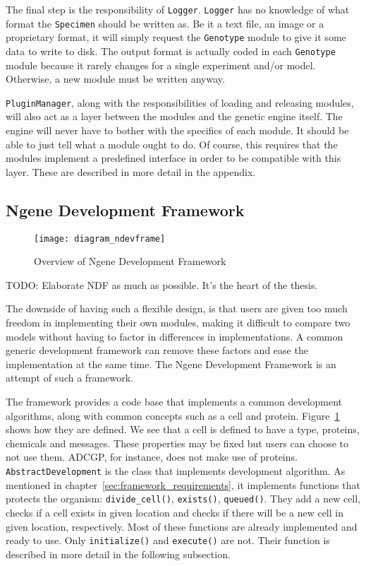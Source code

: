 The final step is the responsibility of \texttt{Logger}. \texttt{Logger} has no knowledge of what format the \texttt{Specimen} should be written as. Be it a text file, an image or a proprietary format, it will simply request the \texttt{Genotype} module to give it some data to write to disk. The output format is actually coded in each \texttt{Genotype} module because it rarely changes for a single experiment and/or model. Otherwise, a new module must be written anyway.

\texttt{PluginManager}, along with the responsibilities of loading and releasing modules, will also act as a layer between the modules and the genetic engine itself. The engine will never have to bother with the specifics of each module. It should be able to just tell what a module ought to do. Of course, this requires that the modules implement a predefined interface in order to be compatible with this layer. These are described in more detail in the appendix.

\subsection{Ngene Development Framework}
\begin{figure}[!ht]
	\centering
	\texttt{[image: diagram\_ndevframe]}
	\caption{Overview of Ngene Development Framework}
	\label{fig:diagram_ndevframe}
\end{figure}

TODO:
Elaborate NDF as much as possible. It's the heart of the thesis.

The downside of having such a flexible design, is that users are given too much freedom in implementing their own modules, making it difficult to compare two models without having to factor in differences in implementations. A common generic development framework can remove these factors and ease the implementation at the same time. The Ngene Development Framework is an attempt of such a framework.

The framework provides a code base that implements a common development algorithms, along with common concepts such as a cell and protein. Figure~\ref{fig:diagram_ndevframe} shows how they are defined. We see that a cell is defined to have a type, proteins, chemicals and messages. These properties may be fixed but users can choose to not use them. ADCGP, for instance, does not make use of proteins. \texttt{AbstractDevelopment} is the class that implements development algorithm. As mentioned in chapter~\ref{sec:framework_requirements}, it implements functions that protects the organism: \texttt{divide\_cell()}, \texttt{exists()}, \texttt{queued()}. They add a new cell, checks if a cell exists in given location and checks if there will be a new cell in given location, respectively. Most of these functions are already implemented and ready to use. Only \texttt{initialize()} and \texttt{execute()} are not. Their function is described in more detail in the following subsection.

